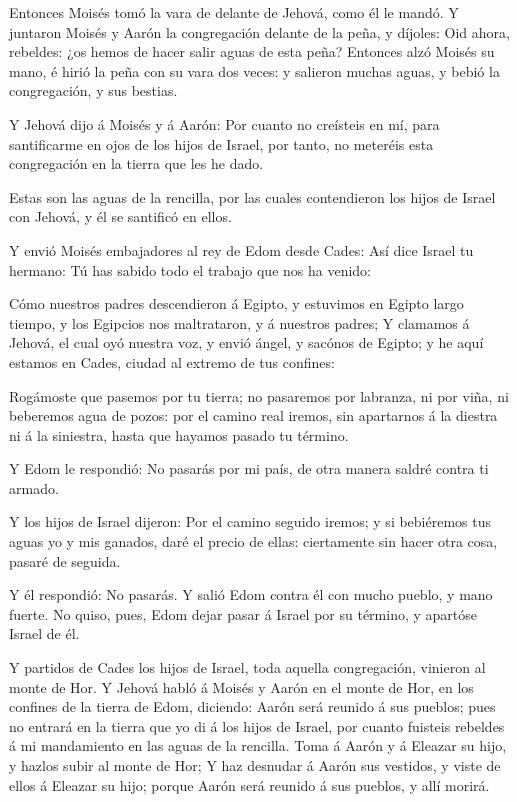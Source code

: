  Entonces Moisés tomó la vara de delante de Jehová, como él
le mandó.  Y juntaron Moisés y Aarón la congregación
delante de la peña, y díjoles: Oid ahora, rebeldes: ¿os hemos de hacer
salir aguas de esta peña?  Entonces alzó Moisés su mano, é
hirió la peña con su vara dos veces: y salieron muchas aguas, y bebió la
congregación, y sus bestias.

 Y Jehová dijo á Moisés y á Aarón: Por cuanto no creísteis
en mí, para santificarme en ojos de los hijos de Israel, por tanto, no
meteréis esta congregación en la tierra que les he dado.

 Estas son las aguas de la rencilla, por las cuales
contendieron los hijos de Israel con Jehová, y él se santificó en ellos.

 Y envió Moisés embajadores al rey de Edom desde Cades: Así
dice Israel tu hermano: Tú has sabido todo el trabajo que nos ha venido:

 Cómo nuestros padres descendieron á Egipto, y estuvimos en
Egipto largo tiempo, y los Egipcios nos maltrataron, y á nuestros
padres;  Y clamamos á Jehová, el cual oyó nuestra voz, y
envió ángel, y sacónos de Egipto; y he aquí estamos en Cades, ciudad al
extremo de tus confines:

 Rogámoste que pasemos por tu tierra; no pasaremos por
labranza, ni por viña, ni beberemos agua de pozos: por el camino real
iremos, sin apartarnos á la diestra ni á la siniestra, hasta que hayamos
pasado tu término.

 Y Edom le respondió: No pasarás por mi país, de otra
manera saldré contra ti armado.

 Y los hijos de Israel dijeron: Por el camino seguido
iremos; y si bebiéremos tus aguas yo y mis ganados, daré el precio de
ellas: ciertamente sin hacer otra cosa, pasaré de seguida.

 Y él respondió: No pasarás. Y salió Edom contra él con
mucho pueblo, y mano fuerte.  No quiso, pues, Edom dejar
pasar á Israel por su término, y apartóse Israel de él.

 Y partidos de Cades los hijos de Israel, toda aquella
congregación, vinieron al monte de Hor.  Y Jehová habló á
Moisés y Aarón en el monte de Hor, en los confines de la tierra de Edom,
diciendo:  Aarón será reunido á sus pueblos; pues no
entrará en la tierra que yo di á los hijos de Israel, por cuanto
fuisteis rebeldes á mi mandamiento en las aguas de la rencilla.
 Toma á Aarón y á Eleazar su hijo, y hazlos subir al monte
de Hor;  Y haz desnudar á Aarón sus vestidos, y viste de
ellos á Eleazar su hijo; porque Aarón será reunido á sus pueblos, y allí
morirá.

